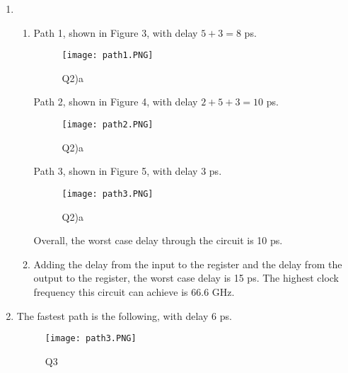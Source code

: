 \documentclass[11pt,letterpaper,titlepage]{article}
\begin{document}
\begin{enumerate}
\begin{enumerate}
    \end{enumerate}
    
    \item %
    
    \begin{enumerate}
        
        \item %
        
        Path 1, shown in Figure 3, with delay $5+3=8$ ps.
        
        \begin{figure}[ht]
            \centering
            \texttt{[image: path1.PNG]}
            \caption{Q2)a}
        \end{figure}
        
        \newpage
        
        Path 2, shown in Figure 4, with delay $2+5+3=10$ ps.
        
        \begin{figure}[ht]
            \centering
            \texttt{[image: path2.PNG]}
            \caption{Q2)a}
        \end{figure}
        
        Path 3, shown in Figure 5, with delay $3$ ps.
        
        \begin{figure}[ht]
            \centering
            \texttt{[image: path3.PNG]}
            \caption{Q2)a}
        \end{figure}
        
        Overall, the worst case delay through the circuit is 10 ps.
        
        \item %
        
        Adding the delay from the input to the register and the delay from the output to the register, the worst case delay is 15 ps. The highest clock frequency this circuit can achieve is 66.6 GHz.
        
    \end{enumerate}
    
    \item %
    
    The fastest path is the following, with delay 6 ps.
    
    \begin{figure}[ht]
        \centering
        \texttt{[image: path3.PNG]}
        \caption{Q3}
    \end{figure}
    

\end{enumerate}
\end{document}
